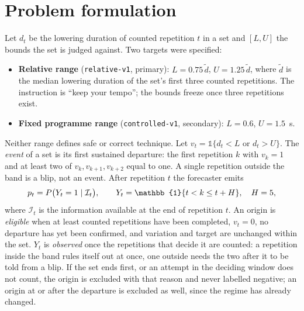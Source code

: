 \documentclass[11pt,a4paper]{article}
\begin{document}
\section{Problem formulation}

Let $d_t$ be the lowering duration of counted repetition $t$ in a set and $[L,U]$ the bounds the set is judged against. Two targets were specified:
\begin{itemize}
\item \textbf{Relative range} (\texttt{relative-v1}, primary): $L = 0.75\,\tilde d$, $U = 1.25\,\tilde d$, where $\tilde d$ is the median lowering duration of the set's first three counted repetitions. The instruction is ``keep your tempo''; the bounds freeze once three repetitions exist.
\item \textbf{Fixed programme range} (\texttt{controlled-v1}, secondary): $L=0.6$, $U=1.5$~s.
\end{itemize}
Neither range defines safe or correct technique. Let $v_t = \mathbb{1}\{d_t < L \text{ or } d_t > U\}$. The \emph{event} of a set is its first sustained departure: the first repetition $k$ with $v_k = 1$ and at least two of $v_k, v_{k+1}, v_{k+2}$ equal to one. A single repetition outside the band is a blip, not an event. After repetition $t$ the forecaster emits
\begin{equation}
p_t = P\big(Y_t = 1 \mid \mathcal{I}_t\big), \qquad Y_t = \mathbb{1}\{t < k \le t + H\}, \quad H = \Horizon,
\end{equation}
where $\mathcal{I}_t$ is the information available at the end of repetition $t$. An origin is \emph{eligible} when at least \MinReps{} counted repetitions have been completed, $v_t = 0$, no departure has yet been confirmed, and variation and target are unchanged within the set. $Y_t$ is \emph{observed} once the repetitions that decide it are counted: a repetition inside the band rules itself out at once, one outside needs the two after it to be told from a blip. If the set ends first, or an attempt in the deciding window does not count, the origin is excluded with that reason and never labelled negative; an origin at or after the departure is excluded as well, since the regime has already changed.
\end{document}
